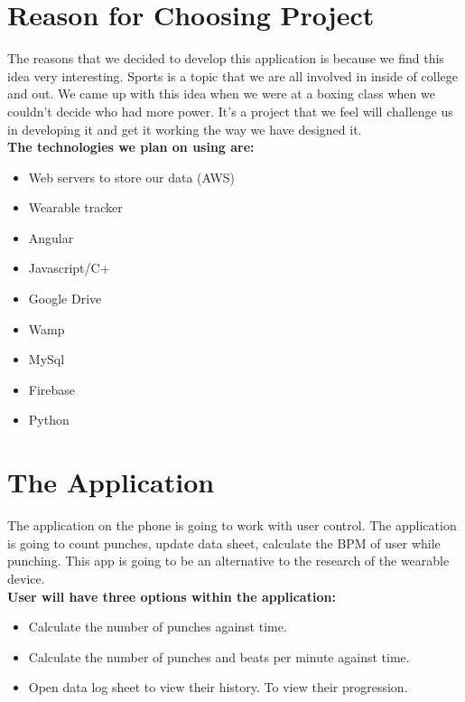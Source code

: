 \documentclass[a4paper,12pt,twoside]{report}
\begin{document}
\section{Reason for Choosing Project}
The reasons that we decided to develop this application is because we find this idea very interesting. Sports is a topic that we are all involved in inside of college and out. We came up with this idea when we were at a boxing class when we couldn't decide who had more power. It’s a project that we feel will challenge us in developing it and get it working the way we have designed it.
\\
\textbf{The technologies we plan on using are:}
\begin{itemize}
\item{Web servers to store our data (AWS)}
\item{Wearable tracker}
\item{Angular}
\item{Javascript/C+}
\item{Google Drive}
\item{Wamp}
\item{MySql}
\item{Firebase}
\item{Python}
\end{itemize}

\section{The Application}
The application on the phone is going to work with user control. The application is going to count punches, update data sheet, calculate the BPM of user while punching. This app is going to be an alternative to the research of the wearable device.
\\
\textbf{User will have three options within the application:}
\begin{itemize}
\item Calculate the number of punches against time.
\item Calculate the number of punches and beats per minute against time.
\item Open data log sheet to view their history. To view their progression.
\end{itemize}
\end{document}
